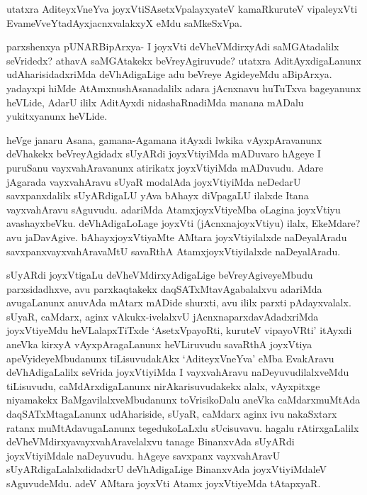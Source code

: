 \begin{artha}%
utatxra AditeyxVneYva joyxVtiSAsetxVpalayxyateV kamaRkuruteV vipaleyxVti EvameVveYtadAyxjacnxvalakxyX eMdu saMkeSxVpa. 

parxshenxya pUNARBipArxya- I joyxVti deVheVMdirxyAdi saMGAtadalilx seVridedx? athavA saMGAtakekx beVreyAgiruvude? utatxra AditAyxdigaLanunx udAharisidadxriMda deVhAdigaLige adu beVreye AgideyeMdu aBipArxya. yadayxpi hiMde AtAmxnushAsanadalilx adara jAcnxnavu huTuTxva bageyanunx heVLide, AdarU ililx AditAyxdi nidashaRnadiMda manana mADalu yukitxyanunx heVLide. 
\end{artha}

\begin{artha}
heVge janaru Asana, gamana-Agamana itAyxdi lwkika vAyxpAravanunx deVhakekx beVreyAgidadx sUyARdi joyxVtiyiMda mADuvaro hAgeye I puruSanu vayxvahAravanunx atirikatx joyxVtiyiMda mADuvudu. Adare jAgarada vayxvahAravu sUyaR modalAda joyxVtiyiMda neDedarU savxpanxdalilx sUyARdigaLU yAva bAhayx diVpagaLU ilalxde Itana vayxvahAravu sAguvudu. adariMda AtamxjoyxVtiyeMba oLagina joyxVtiyu avashayxbeVku. deVhAdigaLoLage joyxVti (jAcnxnajoyxVtiyu) ilalx, EkeMdare? avu jaDavAgive. bAhayxjoyxVtiyaMte AMtara joyxVtiyilalxde naDeyalAradu savxpanxvayxvahAravaMtU savaRthA AtamxjoyxVtiyilalxde naDeyalAradu.  
\end{artha}

\begin{artha}
sUyARdi joyxVtigaLu deVheVMdirxyAdigaLige beVreyAgiveyeMbudu parxsidadhxve, avu parxkaqtakekx daqSATxMtavAgabalalxvu adariMda avugaLanunx anuvAda mAtarx mADide shurxti, avu ililx parxti pAdayxvalalx. sUyaR, caMdarx, aginx vAkukx-ivelalxvU jAcnxnaparxdavAdadxriMda joyxVtiyeMdu heVLalapxTiTxde `AsetxVpayoRti, kuruteV vipayoVRti' itAyxdi aneVka kirxyA vAyxpAragaLanunx heVLiruvudu savaRthA joyxVtiya apeVyideyeMbudanunx tiLisuvudakAkx `AditeyxVneYva' eMba EvakAravu deVhAdigaLalilx seVrida joyxVtiyiMda I vayxvahAravu naDeyuvudilalxveMdu tiLisuvudu, caMdArxdigaLanunx nirAkarisuvudakekx alalx, vAyxpitxge niyamakekx BaMgavilalxveMbudanunx toVrisikoDalu aneVka caMdarxmuMtAda daqSATxMtagaLanunx udAhariside, sUyaR, caMdarx aginx ivu nakaSxtarx ratanx muMtAdavugaLanunx tegedukoLaLxlu sUcisuvavu. hagalu rAtirxgaLalilx deVheVMdirxyavayxvahAravelalxvu tanage BinanxvAda sUyARdi joyxVtiyiMdale naDeyuvudu. hAgeye savxpanx vayxvahAravU sUyARdigaLalalxdidadxrU deVhAdigaLige BinanxvAda joyxVtiyiMdaleV sAguvudeMdu. adeV AMtara joyxVti Atamx joyxVtiyeMda tAtapxyaR.
\end{artha}

